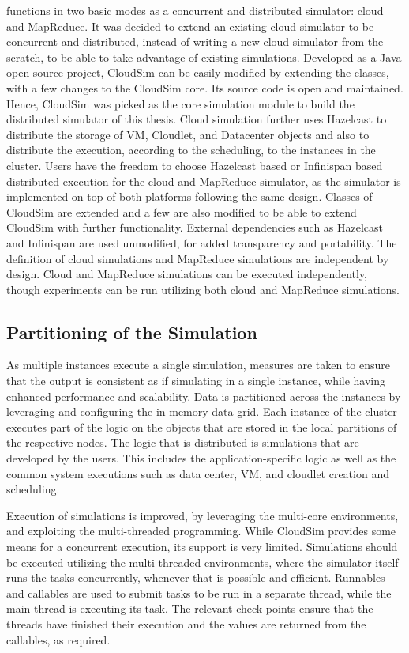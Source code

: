  functions in two basic modes as a concurrent and distributed simulator: cloud and MapReduce. It was decided to extend an existing cloud simulator to be concurrent and distributed, instead of writing a new cloud simulator from the scratch, to be able to take advantage of existing simulations. Developed as a Java open source project, CloudSim can be easily modified by extending the classes, with a few changes to the CloudSim core. Its source code is open and maintained. Hence, CloudSim was picked as the core simulation module to build the distributed simulator of this thesis. Cloud simulation further uses Hazelcast to distribute the storage of VM, Cloudlet, and Datacenter objects and also to distribute the execution, according to the scheduling, to the instances in the cluster. Users have the freedom to choose Hazelcast based or Infinispan based distributed execution for the cloud and MapReduce simulator, as the simulator is implemented on top of both platforms following the same design. Classes of CloudSim are extended and a few are also modified to be able to extend CloudSim with further functionality.  External dependencies such as Hazelcast and Infinispan are used unmodified, for added transparency and portability. The definition of cloud simulations and MapReduce simulations are independent by design. Cloud and MapReduce simulations can be executed independently, though experiments can be run utilizing both cloud and MapReduce simulations. 

\subsection{Partitioning of the Simulation}
\label{ssec:3partition}
As multiple instances execute a single simulation, measures are taken to ensure that the output is consistent as if simulating in a single instance, while having enhanced performance and scalability. Data is partitioned across the instances by leveraging and configuring the in-memory data grid. Each instance of the cluster executes part of the logic on the objects that are stored in the local partitions of the respective nodes. The logic that is distributed is simulations that are developed by the users. This includes the application-specific logic as well as the common system executions such as data center, VM, and cloudlet creation and scheduling.

Execution of simulations is improved, by leveraging the multi-core environments, and exploiting the multi-threaded programming. While CloudSim provides some means for a concurrent execution, its support is very limited. Simulations should be executed utilizing the multi-threaded environments, where the simulator itself runs the tasks concurrently, whenever that is possible and efficient. Runnables and callables are used to submit tasks to be run in a separate thread, while the main thread is executing its task. The relevant check points ensure that the threads have finished their execution and the values are returned from the callables, as required. 

